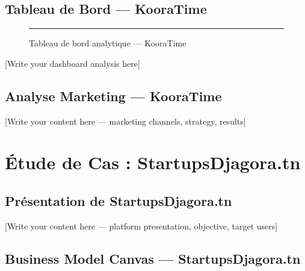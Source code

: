 \subsection{Tableau de Bord — KooraTime}
\label{sec:kooratime-dashboard}

\begin{figure}[H]
  \centering
  \rule{0.95\textwidth}{6cm} %
  \caption{Tableau de bord analytique — KooraTime}
  \label{fig:kooratime-dashboard}
\end{figure}

[Write your dashboard analysis here]

\subsection{Analyse Marketing — KooraTime}
\label{sec:kooratime-marketing}

[Write your content here — marketing channels, strategy, results]


\section{Étude de Cas : StartupsDjagora.tn}
\label{sec:djagora}

\subsection{Présentation de StartupsDjagora.tn}
\label{sec:djagora-presentation}

[Write your content here — platform presentation, objective, target users]

\subsection{Business Model Canvas — StartupsDjagora.tn}
\label{sec:djagora-bmc}




